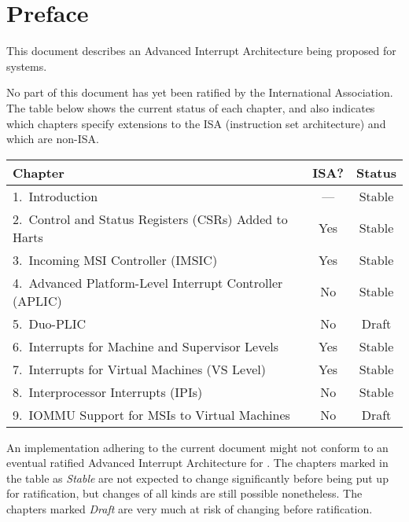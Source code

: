 
\chapter{Preface}

This document describes an Advanced Interrupt Architecture
being proposed for {\RISCV} systems.

No part of this document has yet been ratified
by the {\RISCV} International Association.
The table below shows the current status of each chapter,
and also indicates which chapters specify extensions to the
{\RISCV} ISA (instruction set architecture) and which are non-ISA.

{
\begin{table}[hbt]
\centering
\begin{tabular}{|l|c|c|}
\hline
Chapter                                                  & ISA? & Status \\
\hline
\hline
1.\ Introduction                                         & ---  & Stable \\
2.\ Control and Status Registers (CSRs) Added to Harts   & Yes  & Stable \\
3.\ Incoming MSI Controller (IMSIC)                      & Yes  & Stable \\
4.\ Advanced Platform-Level Interrupt Controller (APLIC) & No   & Stable \\
5.\ Duo-PLIC                                             & No   & Draft \\
6.\ Interrupts for Machine and Supervisor Levels         & Yes  & Stable \\
7.\ Interrupts for Virtual Machines (VS Level)           & Yes  & Stable \\
8.\ Interprocessor Interrupts (IPIs)                     & No   & Stable \\
9.\ IOMMU Support for MSIs to Virtual Machines           & No   & Draft \\
\hline
\end{tabular}
\end{table}
}

An implementation adhering to the current document might not conform
to an eventual ratified Advanced Interrupt Architecture for {\RISCV}.
The chapters marked in the table as \emph{Stable} are not expected
to change significantly before being put up for ratification,
but changes of all kinds are still possible nonetheless.
The chapters marked \emph{Draft} are very much
at risk of changing before ratification.

